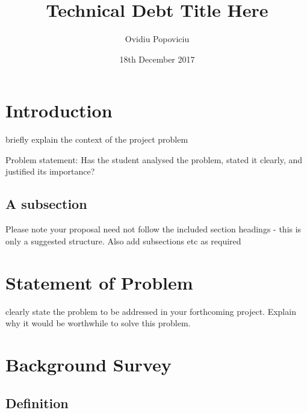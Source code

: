 \documentclass{mprop}
\begin{document}
\title{Technical Debt Title Here}
\author{Ovidiu Popoviciu}
\date{18th December 2017}
\maketitle

\tableofcontents
\newpage

\section{Introduction}\label{intro}

briefly explain the context of the project problem

Problem statement: Has the student analysed the problem, stated it clearly, and justified its importance?

\subsection{A subsection}
Please note your proposal need not follow the included section headings - this is only a suggested structure. Also add subsections etc as required

\section{Statement of Problem}

clearly state the problem to be addressed in your forthcoming project. Explain why it would be worthwhile to solve this problem.

\section{Background Survey}
\subsection{Definition}
\end{document}
